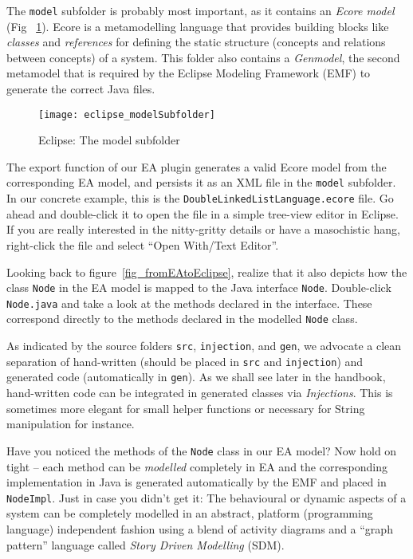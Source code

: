 The  \texttt{model} subfolder is probably most important, as it contains an  \emph{Ecore model} (Fig ~\ref{fig_modelSubfolder}).  
Ecore is a metamodelling language that provides building  blocks like \emph{classes} and \emph{references} for defining the  static structure (concepts and relations between concepts) of a system. This folder also contains a \emph{Genmodel}, the second metamodel that is required by the Eclipse Modeling Framework (EMF) to generate the correct Java files.

\begin{figure}[htbp]
	\centering
  \texttt{[image: eclipse\_modelSubfolder]}
	\caption{Eclipse: The model subfolder}
	\label{fig_modelSubfolder}
\end{figure}

The  export function of our EA plugin generates a valid Ecore model from the  corresponding EA model, and persists it as an XML file in the \texttt{model}  subfolder.  
In our concrete example, this is the \texttt{DoubleLinkedListLanguage.ecore} file.  
Go ahead and double-click it to open the file in a simple tree-view editor in Eclipse.  
If you are really interested in the nitty-gritty details or have a masochistic hang, right-click the file and select ``Open With/Text Editor''.

Looking back to figure~\ref{fig_fromEAtoEclipse}, realize that it also depicts how the class \texttt{Node} in the EA model is mapped to the Java interface \texttt{Node}.  
Double-click \texttt{Node.java} and take a look at the methods declared in the interface. These correspond directly to the methods declared in the modelled \texttt{Node} class.  

As indicated by the source folders \texttt{src}, \texttt{injection}, and \texttt{gen}, we advocate a clean separation of hand-written (should be placed in \texttt{src} and \texttt{injection}) and generated code (automatically in \texttt{gen}).  
As we shall see later in the handbook, hand-written code can be integrated in generated classes via \emph{Injections}. 
This is sometimes more elegant for small helper functions or necessary for String manipulation for instance.

Have you noticed the methods of the \texttt{Node} class in our EA model? 
Now hold on tight -- each method can be \emph{modelled} completely in EA and the corresponding implementation in Java is generated automatically by the EMF and placed in \texttt{NodeImpl}.  
Just in case you didn't get it: The behavioural or dynamic aspects of a system can be completely modelled in an abstract, platform (programming language) independent fashion using a blend of activity  diagrams and a ``graph pattern'' language called \textit{Story Driven Modelling} (SDM).  


